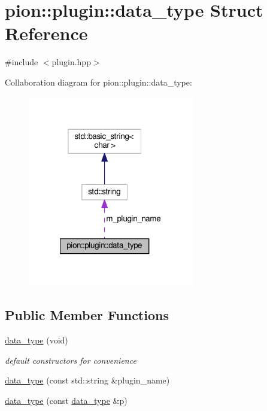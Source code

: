 \hypertarget{structpion_1_1plugin_1_1data__type}{\section{pion\-:\-:plugin\-:\-:data\-\_\-type Struct Reference}
\label{structpion_1_1plugin_1_1data__type}
}


{\ttfamily \#include $<$plugin.\-hpp$>$}



Collaboration diagram for pion\-:\-:plugin\-:\-:data\-\_\-type\-:
\nopagebreak
\begin{figure}[H]
\begin{center}
\leavevmode
\includegraphics[width=206pt]{structpion_1_1plugin_1_1data__type__coll__graph}
\end{center}
\end{figure}
\subsection*{Public Member Functions}
\begin{DoxyCompactItemize}
\item 
\hyperlink{structpion_1_1plugin_1_1data__type_a22a8f203cafa3f97ae61fdbe607557a8}{data\-\_\-type} (void)
\begin{DoxyCompactList}\small\item\em default constructors for convenience \end{DoxyCompactList}\item 
\hyperlink{structpion_1_1plugin_1_1data__type_aece7d2d77c4c119df5859f765fa568b4}{data\-\_\-type} (const std\-::string \&plugin\-\_\-name)
\item 
\hyperlink{structpion_1_1plugin_1_1data__type_a15d9c1fdfdab4585e516b041084bbe5d}{data\-\_\-type} (const \hyperlink{structpion_1_1plugin_1_1data__type}{data\-\_\-type} \&p)
\end{DoxyCompactItemize}
